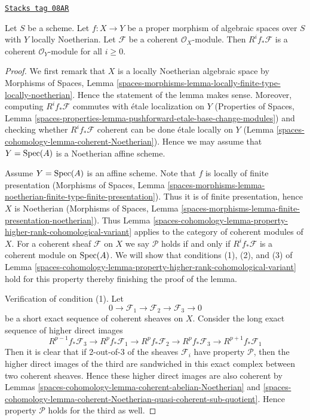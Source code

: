 \begin{lemma}
\label{spaces-cohomology-lemma-proper-pushforward-coherent}
\href{https://stacks.math.columbia.edu/tag/08AR}{\texttt{Stacks tag 08AR}}

Let $S$ be a scheme. Let $f : X \to Y$ be a proper morphism
of algebraic spaces over $S$ with $Y$ locally Noetherian.
Let $\mathcal{F}$ be a coherent $\mathcal{O}_X$-module.
Then $R^if_*\mathcal{F}$ is a coherent $\mathcal{O}_Y$-module
for all $i \geq 0$.
\end{lemma}

\begin{proof}
We first remark that $X$ is a locally Noetherian algebraic space
by Morphisms of Spaces, Lemma
\ref{spaces-morphisms-lemma-locally-finite-type-locally-noetherian}.
Hence the statement of the lemma makes sense. Moreover, computing
$R^if_*\mathcal{F}$ commutes with \'etale localization on $Y$
(Properties of Spaces, Lemma
\ref{spaces-properties-lemma-pushforward-etale-base-change-modules})
and checking whether $R^if_*\mathcal{F}$ coherent can be done
\'etale locally on $Y$ (Lemma \ref{spaces-cohomology-lemma-coherent-Noetherian}).
Hence we may assume that $Y = \operatorname{Spec}(A)$ is a Noetherian affine scheme.

\medskip\noindent
Assume $Y = \operatorname{Spec}(A)$ is an affine scheme. Note that $f$ is locally
of finite presentation
(Morphisms of Spaces, Lemma
\ref{spaces-morphisms-lemma-noetherian-finite-type-finite-presentation}).
Thus it is of finite presentation, hence $X$ is Noetherian
(Morphisms of Spaces, Lemma
\ref{spaces-morphisms-lemma-finite-presentation-noetherian}).
Thus Lemma \ref{spaces-cohomology-lemma-property-higher-rank-cohomological-variant}
applies to the category of coherent modules of $X$.
For a coherent sheaf $\mathcal{F}$ on $X$ we say $\mathcal{P}$ holds
if and only if $R^if_*\mathcal{F}$ is a coherent module on $\operatorname{Spec}(A)$.
We will show that conditions (1), (2), and (3) of
Lemma \ref{spaces-cohomology-lemma-property-higher-rank-cohomological-variant} hold
for this property thereby finishing the proof of the lemma.

\medskip\noindent
Verification of condition (1). Let
$$
0 \to \mathcal{F}_1 \to \mathcal{F}_2 \to \mathcal{F}_3 \to 0
$$
be a short exact sequence of coherent sheaves on $X$.
Consider the long exact sequence of higher direct images
$$
R^{p - 1}f_*\mathcal{F}_3 \to
R^pf_*\mathcal{F}_1 \to
R^pf_*\mathcal{F}_2 \to
R^pf_*\mathcal{F}_3 \to
R^{p + 1}f_*\mathcal{F}_1
$$
Then it is clear that if 2-out-of-3 of the sheaves $\mathcal{F}_i$
have property $\mathcal{P}$, then the higher direct images of the
third are sandwiched in this exact complex between two coherent
sheaves. Hence these higher direct images are also coherent by
Lemmas \ref{spaces-cohomology-lemma-coherent-abelian-Noetherian} and
\ref{spaces-cohomology-lemma-coherent-Noetherian-quasi-coherent-sub-quotient}.
Hence property $\mathcal{P}$ holds for the third as well.


\end{proof}
